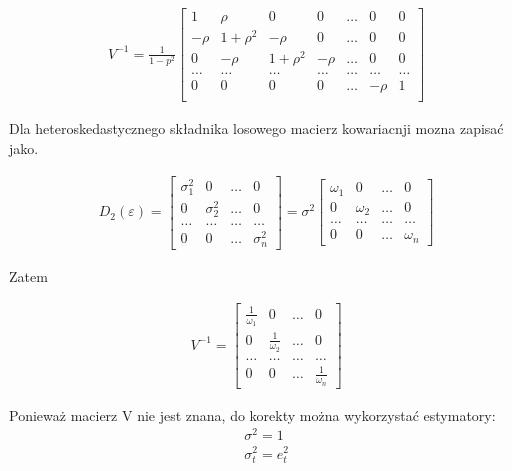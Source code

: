 \begin{equation}
    \begin{split}
        &V^{-1} = \frac{1}{1-p^{2}} \begin{bmatrix}
                                        1 & \rho & 0 & 0 & \dots & 0 & 0\\
                                        -\rho & 1+\rho^{2} & -\rho & 0 & \dots & 0 & 0 \\
                                        0 & -\rho & 1 + \rho^{2} & -\rho & \dots & 0 & 0 \\
                                        \dots & \dots & \dots & \dots & \dots & \dots & \dots \\
                                        0 & 0 & 0 & 0 & \dots & -\rho & 1 \\
        \end{bmatrix}
    \end{split}
\end{equation}


Dla heteroskedastycznego składnika losowego macierz kowariacnji mozna zapisać jako.

\begin{equation}
    \begin{split}
        &D_{2}(\varepsilon) =
        \begin{bmatrix}
            \sigma_{1}^{2} & 0 & \dots & 0\\
            0 & \sigma_{2}^{2} & \dots & 0\\
            \dots & \dots & \dots & \dots \\
            0 & 0 & \dots & \sigma_{n}^{2}
        \end{bmatrix}
        =
        \sigma^{2}
        \begin{bmatrix}
            \omega_{1} & 0 & \dots  & 0\\
            0 & \omega_{2} & \dots  & 0\\
            \dots & \dots & \dots & \dots\\
            0 & 0 & \dots & \omega_{n}
        \end{bmatrix}
    \end{split}
\end{equation}

Zatem

\begin{equation}
    \begin{split}
        &V^{-1} = \begin{bmatrix}
                      \frac{1}{\omega_{1}} & 0 & \dots & 0\\
                      0 & \frac{1}{\omega_{2}} & \dots & 0\\
                      \dots & \dots & \dots & \dots\\
                      0 & 0 & \dots & \frac{1}{\omega_{n}}
        \end{bmatrix}
    \end{split}
\end{equation}

Ponieważ macierz V nie jest znana, do korekty można wykorzystać estymatory:
\begin{equation}
    \begin{split}
        &\sigma^{2} =1 \\
        &\sigma_{t}^{2} = e_{t}^{2}
    \end{split}
\end{equation}